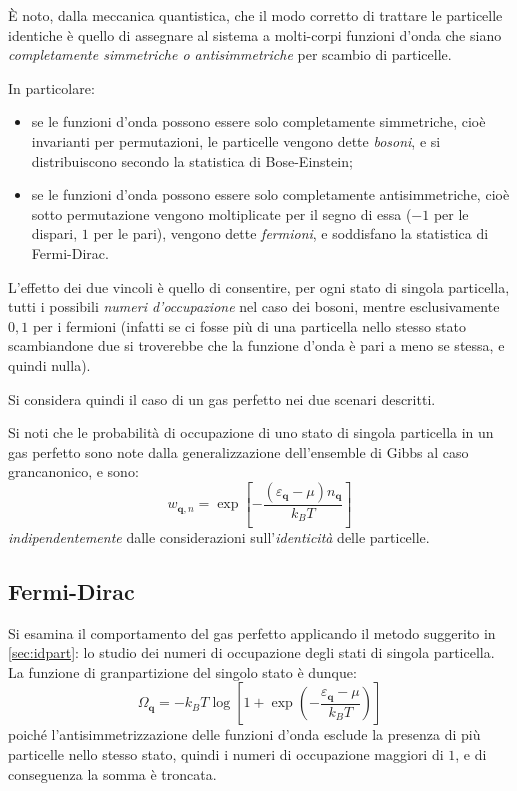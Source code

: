 \`E noto, dalla meccanica quantistica, che il modo corretto di trattare le particelle identiche è quello di assegnare al sistema a molti-corpi funzioni d'onda che siano \textit{completamente simmetriche o antisimmetriche} per scambio di particelle.

In particolare: 
\begin{itemize}
	\item se le funzioni d'onda possono essere solo completamente simmetriche, cioè invarianti per permutazioni, le particelle vengono dette \textit{bosoni}, e si distribuiscono secondo la statistica di Bose-Einstein;
	\item se le funzioni d'onda possono essere solo completamente antisimmetriche, cioè sotto permutazione vengono moltiplicate per il segno di essa ($-1$ per le dispari, $1$ per le pari), vengono dette \textit{fermioni}, e soddisfano la statistica di Fermi-Dirac.
\end{itemize}

L'effetto dei due vincoli è quello di consentire, per ogni stato di singola particella, tutti i possibili \textit{numeri d'occupazione} nel caso dei bosoni, mentre esclusivamente $0,1$ per i fermioni (infatti se ci fosse più di una particella nello stesso stato scambiandone due si troverebbe che la funzione d'onda è pari a meno se stessa, e quindi nulla).
\newline

Si considera quindi il caso di un gas perfetto nei due scenari descritti.

Si noti che le probabilità di occupazione di uno stato di singola particella in un gas perfetto sono note dalla generalizzazione dell'ensemble di Gibbs al caso grancanonico, e sono:
\begin{equation*}
w_{\textbf{q},n} = \exp \left[-\frac{(\varepsilon_{\textbf{q}} - \mu) n_{\textbf{q}}}{k_B T}\right]
\end{equation*}
\textit{indipendentemente} dalle considerazioni sull'\textit{identicità} delle particelle.

\subsection{Fermi-Dirac}

Si esamina il comportamento del gas perfetto applicando il metodo suggerito in \cref{sec:idpart}: lo studio dei numeri di occupazione degli stati di singola particella.
La funzione di granpartizione del singolo stato è dunque:
\begin{equation*}
\Omega_{\textbf{q}} = - k_B T \log \left[1 + \exp \left(-\frac{\varepsilon_{\textbf{q}} - \mu}{k_B T}\right)\right]
\end{equation*}
poiché l'antisimmetrizzazione delle funzioni d'onda esclude la presenza di più particelle nello stesso stato, quindi i numeri di occupazione maggiori di $1$, e di conseguenza la somma è troncata.

